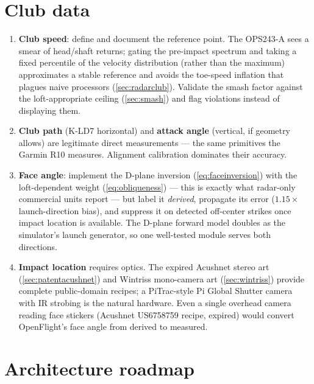 \section{Club data}

\begin{enumerate}
\item \textbf{Club speed}: define and document the reference point. The
OPS243-A sees a smear of head/shaft returns; gating the pre-impact
spectrum and taking a fixed percentile of the velocity distribution
(rather than the maximum) approximates a stable reference and avoids the
toe-speed inflation that plagues naive processors
(\cref{sec:radarclub}). Validate the smash factor against the
loft-appropriate ceiling (\cref{sec:smash}) and flag violations instead
of displaying them.
\item \textbf{Club path} (K-LD7 horizontal) and \textbf{attack angle}
(vertical, if geometry allows) are legitimate direct measurements ---
the same primitives the Garmin R10 measures. Alignment calibration
dominates their accuracy.
\item \textbf{Face angle}: implement the D-plane inversion
(\cref{eq:faceinversion}) with the loft-dependent weight
(\cref{eq:obliqueness}) --- this is exactly what radar-only commercial
units report --- but label it \emph{derived}, propagate its error
($1.15\times$ launch-direction bias), and suppress it on detected
off-center strikes once impact location is available. The D-plane
forward model doubles as the simulator's launch generator, so one
well-tested module serves both directions.
\item \textbf{Impact location} requires optics. The expired Acushnet
stereo art (\cref{sec:patentacushnet}) and Wintriss mono-camera art
(\cref{sec:wintriss}) provide complete public-domain recipes; a
PiTrac-style Pi Global Shutter camera with IR strobing is the natural
hardware. Even a single overhead camera reading face stickers
(Acushnet US6758759 recipe, expired) would convert OpenFlight's face
angle from derived to measured.
\end{enumerate}

\section{Architecture roadmap}

